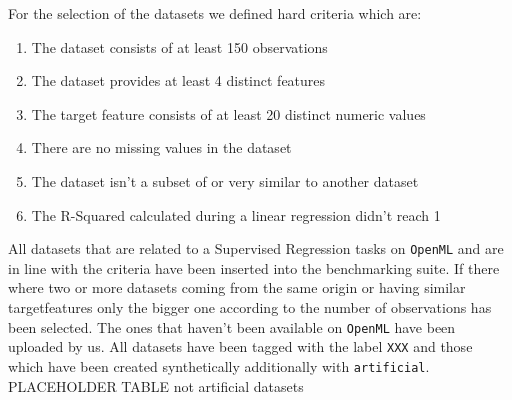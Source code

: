 \documentclass[a4paper]{article}
\begin{document}
For the selection of the datasets we defined hard criteria which are: 
\begin{enumerate}
	\item The dataset consists of at least 150 observations 
	\item The dataset provides at least 4 distinct features 
	\item The target feature consists of at least 20 distinct numeric values 
	\item There are no missing values in the dataset 
	\item The dataset isn't a subset of or very similar to another dataset 
	\item The R-Squared calculated during a linear regression didn't reach 1
\end{enumerate}
All datasets that are related to a Supervised Regression tasks on \texttt{OpenML} and are in line with the criteria have been inserted into the benchmarking suite. If there where two or more datasets coming from the same origin or having similar targetfeatures only the bigger one according to the number of observations has been selected. The ones that haven't been available on \texttt{OpenML} have been uploaded by us. All datasets have been tagged with the label \texttt{XXX} and those which have been created synthetically additionally with \texttt{artificial}.
\newline 
PLACEHOLDER TABLE not artificial datasets
\end{document}

